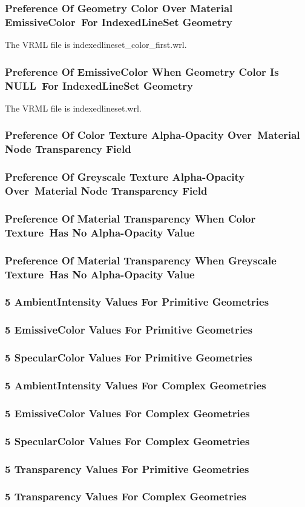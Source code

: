 \documentclass[12pt,letterpaper]{article}
\newcommand{\MatPa}{Preference Of Geometry Color Over Material EmissiveColor~}
\newcommand{\MatPb}{For IndexedLineSet Geometry}
\newcommand{\MatQa}{Preference Of EmissiveColor When Geometry Color Is NULL~}
\newcommand{\MatQb}{For IndexedLineSet Geometry}
\newcommand{\MatRa}{Preference Of Color Texture Alpha-Opacity Over~}
\newcommand{\MatRb}{Material Node Transparency Field}
\newcommand{\MatSa}{Preference Of Greyscale Texture Alpha-Opacity Over~}
\newcommand{\MatSb}{Material Node Transparency Field}
\newcommand{\MatTa}{Preference Of Material Transparency When Color Texture~}
\newcommand{\MatTb}{Has No Alpha-Opacity Value}
\newcommand{\MatUa}{Preference Of Material Transparency When Greyscale Texture~}
\newcommand{\MatUb}{Has No Alpha-Opacity Value}
\newcommand{\MatV}{5 AmbientIntensity Values For Primitive Geometries}
\newcommand{\MatW}{5 EmissiveColor Values For Primitive Geometries}
\newcommand{\MatX}{5 SpecularColor Values For Primitive Geometries}
\newcommand{\MatY}{5 AmbientIntensity Values For Complex Geometries}
\newcommand{\MatZ}{5 EmissiveColor Values For Complex Geometries}
\newcommand{\MatAA}{5 SpecularColor Values For Complex Geometries}
\newcommand{\MatAB}{5 Transparency Values For Primitive Geometries}
\newcommand{\MatAC}{5 Transparency Values For Complex Geometries}
\begin{document}
\subsubsection{\MatPa \MatPb}
The VRML file is indexedlineset\_color\_first.wrl.

\subsubsection{\MatQa \MatQb}
The VRML file is indexedlineset.wrl.

\subsubsection{\MatRa \MatRb}
\subsubsection{\MatSa \MatSb}
\subsubsection{\MatTa \MatTb}
\subsubsection{\MatUa \MatUb}
\subsubsection{\MatV}
\subsubsection{\MatW}
\subsubsection{\MatX}
\subsubsection{\MatY}
\subsubsection{\MatZ}
\subsubsection{\MatAA}
\subsubsection{\MatAB}
\subsubsection{\MatAC}
\end{document}
